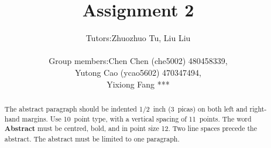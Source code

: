 \documentclass{article} %
\title{Assignment 2}
\begin{document}
\author{%
 \begin{tabular}{rl}
  Tutors: & Zhuozhuo Tu, Liu Liu\\ \\
Group members: & Chen Chen (che5002) 480458339, \\
& Yutong Cao (ycao5602) 470347494,\\
& Yixiong Fang ***
\end{tabular}
}

\maketitle



\begin{abstract}
The abstract paragraph should be indented 1/2~inch (3~picas) on both left and
right-hand margins. Use 10~point type, with a vertical spacing of 11~points.
The word \textbf{Abstract} must be centred, bold, and in point size 12. Two
line spaces precede the abstract. The abstract must be limited to one
paragraph.
\end{abstract}
\end{document}
